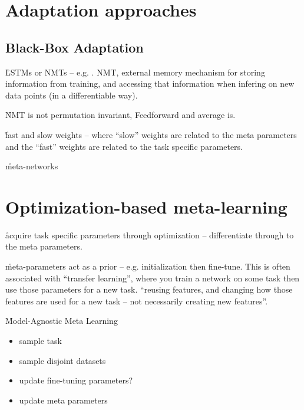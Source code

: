 \section{Adaptation approaches}

\subsection{Black-Box Adaptation}

\r{LSTMs or NMTs -- e.g. \cite{santoro2016meta}. NMT, external memory mechanism for storing information from training, and accessing that information when infering on new data points (in a differentiable way).}

\r{NMT is not permutation invariant, Feedforward and average is.\cite{garnelo2018conditional}}

\r{fast and slow weights -- where ``slow'' weights are related to the meta parameters and the ``fast'' weights are related to the task specific parameters.}

\r{meta-networks \cite{munkhdalai2017meta}}

\section{Optimization-based meta-learning}

\r{acquire task specific parameters through optimization -- differentiate through to the meta parameters.}

\r{meta-parameters act as a prior -- e.g. initialization then fine-tune. This is often associated with ``transfer learning'', where you train a network on some task then use those parameters for a new task. ``reusing features, and changing how those features are used for a new task -- not necessarily creating new features''.}


\r{Model-Agnostic Meta Learning }



\begin{itemize}[noitemsep,topsep=0pt]
	\item sample task
	\item sample disjoint datasets
	\item update fine-tuning parameters?
	\item update meta parameters
\end{itemize}

